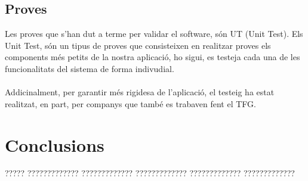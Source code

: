 \documentclass[11pt,catalan,listoffigures,listoftables]{tfgetsinf}
\begin{document}
\section{Proves}
Les proves que s'han dut a terme per validar el software, són UT (Unit Test). Els Unit Test, són un tipus de proves que consisteixen en realitzar proves els components més petits de la nostra aplicació, ho sigui, es testeja cada una de les funcionalitats del sistema de forma indivudial.\\ \\
Addicinalment, per garantir més rigidesa de l'aplicació, el testeig ha estat realitzat, en part, per companys que també es trabaven fent el TFG.


\chapter{Conclusions}

????? ????????????? ????????????? ????????????? ????????????? ????????????? 

\end{document}

